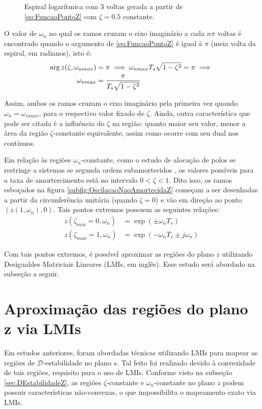 \begin{figure}[!ht]
  \centering
  
  \caption{Espiral logarítmica com 3 voltas gerada a partir de \eqref{eq:FuncaoPontoZ} com $\zeta=0.5$ constante.}
  \label{fig:EspiralLogaritmica}
\end{figure}

O valor de $\omega_n$ no qual os ramos cruzam o eixo imaginário a cada $n\pi$ voltas é encontrado quando o argumento de \eqref{eq:FuncaoPontoZ} é igual à $\pi$ (meia volta da espiral, em radianos), isto é:
\begin{align}
  \arg{z(\zeta,\omega_{nmax})} &= \pi \implies \omega_{nmax}T_s\sqrt{1-\zeta^2} = \pi \implies \notag\\
  \omega_{nmax} &= \dfrac{\pi}{T_s\sqrt{1-\zeta^2}}\label{eq:PontoExtremoZetaZ}
\end{align}

Assim, ambos os ramos cruzam o eixo imaginário pela primeira vez quando $\omega_n = \omega_{nmax}$, para o respectivo valor fixado de $\zeta$. Ainda, outra característica que pode ser citada é a influência do $\zeta$ na região: quanto maior seu valor, menor a área da região $\zeta$-constante equivalente, assim como ocorre com seu dual nos contínuos.

Em relação às regiões $\omega_n$-constante, como o estudo de alocação de polos se restringe a sistemas se segunda ordem subamortecidos \cite{NISE2011} \cite{OGATA2011}, os valores possíveis para a taxa de amortercimento está no intervalo $0 < \zeta < 1$. Dito isso, os ramos esboçados na figura \ref{subfig:OscilacaoNaoAmortecidaZ} começam a ser desenhadas a partir da circunferência unitária (quando $\zeta = 0$) e vão em direção ao ponto $(z(1,\omega_n),0)$.
Tais pontos extremos possuem as seguintes relações:
\begin{subequations}
  \begin{align}
    z(\zeta_{min} = 0,\omega_n) &= \exp{\left(\pm \omega_nT_s\right)}\label{eq:PontoMinimoExtremoWnZ}\\
    z(\zeta_{max} = 1,\omega_n) &= \exp{\left(-\omega_nT_s \pm j\omega_n\right)}\label{eq:PontoMaximoExtremoWnZ}
  \end{align}
\end{subequations}

Com tais pontos extremos, é possível aproximar as regiões do plano $z$ utilizando Desigualdes Matriciais Lineares (LMIs, em inglês). Esse estudo será abordado na subseção a seguir.

\section{Aproximação das regiões do plano z via LMIs}
Em estudos anteriores, foram abordadas técnicas utilizando LMIs para mapear as regiões de $\mathscr{D}$-estabilidade no plano $s$. Tal feito foi realizado devido à convexidade de tais regiões, requisito para o uso de LMIs. Conforme visto na subseção \ref{sec:DEstabilidadeZ}, as regiões $\zeta$-constante e $\omega_n$-constante no plano $z$ podem possuir características não-convexas, o que impossibilita o mapeamento exato via LMIs.

